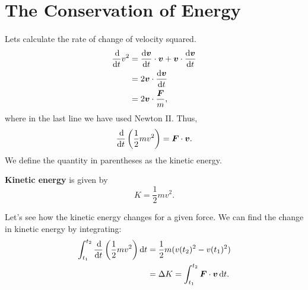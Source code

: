 \documentclass[../classical_mechanics.tex]{subfiles}
\begin{document}
    \section{The Conservation of Energy}
        \paragraph{}
        Lets calculate the rate of change of velocity squared.
        \begin{align}
            \dv{}{t}v^2&=\dv{\vec{v}}{t}\cdot\vec{v}+\vec{v}\cdot\dv{\vec{v}}{t}\\
            &=2\vec{v}\cdot\dv{\vec{v}}{t}\\
            &=2\vec{v}\cdot\frac{\vec{F}}{m},
        \end{align}
        where in the last line we have used Newton II. Thus,
        \begin{equation}
            \dv{}{t}\left(\frac{1}{2}mv^2\right)=\vec{F}\cdot\vec{v}.
        \end{equation}
        We define the quantity in parentheses as the kinetic energy.
        \begin{definition}
            \textbf{Kinetic energy} is given by
            \begin{equation}
                K=\frac{1}{2}mv^2.
            \end{equation}
        \end{definition}
        Let's see how the kinetic energy changes for a given force. We can find the change in kinetic energy by integrating:
        \begin{align}
            \int_{t_1}^{t_2}\dv{}{t}\left(\frac{1}{2}mv^2\right)\dd{t}&=\frac{1}{2}m(v(t_2)^2-v(t_1)^2)\\
            &=\Delta K=\int_{t_1}^{t_2}\vec{F}\cdot\vec{v}\dd{t}.
        \end{align}
\end{document}
